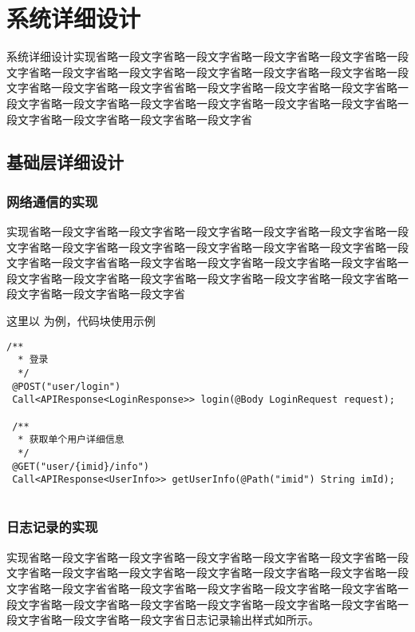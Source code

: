\section{系统详细设计}

	系统详细设计实现省略一段文字省略一段文字省略一段文字省略一段文字省略一段文字省略一段文字省略一段文字省略一段文字省略一段文字省略一段文字省略一段文字省略一段文字省略一段文字省省略一段文字省略一段文字省略一段文字省略一段文字省略一段文字省略一段文字省略一段文字省略一段文字省略一段文字省略一段文字省略一段文字省略一段文字省略一段文字省

  \subsection{基础层详细设计}
	
   	\subsubsection{网络通信的实现}

		实现省略一段文字省略一段文字省略一段文字省略一段文字省略一段文字省略一段文字省略一段文字省略一段文字省略一段文字省略一段文字省略一段文字省略一段文字省略一段文字省省略一段文字省略一段文字省略一段文字省略一段文字省略一段文字省略一段文字省略一段文字省略一段文字省略一段文字省略一段文字省略一段文字省略一段文字省略一段文字省

		
		这里以 为例，代码块使用示例
		
		
		\begin{lstlisting}[caption=APIService , label=code_api_service]
 /** 
  * 登录 
  */
 @POST("user/login")
 Call<APIResponse<LoginResponse>> login(@Body LoginRequest request);

 /** 
  * 获取单个用户详细信息
  */
 @GET("user/{imid}/info")
 Call<APIResponse<UserInfo>> getUserInfo(@Path("imid") String imId);
 
		\end{lstlisting}                 

	
			
   	\subsubsection{日志记录的实现}
    
    实现省略一段文字省略一段文字省略一段文字省略一段文字省略一段文字省略一段文字省略一段文字省略一段文字省略一段文字省略一段文字省略一段文字省略一段文字省略一段文字省省略一段文字省略一段文字省略一段文字省略一段文字省略一段文字省略一段文字省略一段文字省略一段文字省略一段文字省略一段文字省略一段文字省略一段文字省略一段文字省日志记录输出样式如所示。
    
